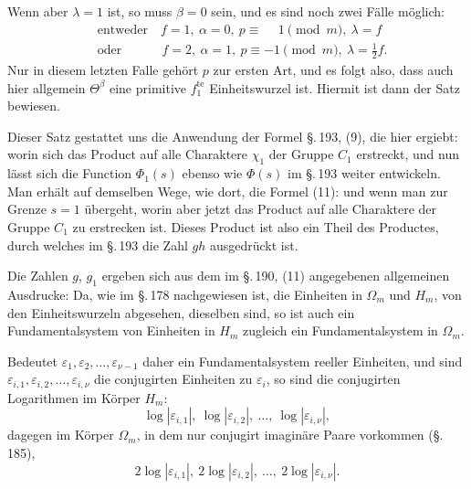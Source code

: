 Wenn aber $\lambda=1$ ist, so muss $\beta=0$ sein, und es sind
noch zwei Fälle möglich:
\[
\begin{aligned}
&\text{entweder}\quad f=1,\ \alpha=0,\ p\equiv\phantom{-}1\pmod{m},\ \lambda=f\\
&\text{oder}\qquad\quad\, f=2,\ \alpha=1,\ p\equiv -1\pmod{m},\ \lambda=\tfrac12 f.
\end{aligned}
\]
Nur in diesem letzten Falle gehört $p$ zur ersten Art, und es
folgt also, dass auch hier allgemein $\Theta^{\beta}$ eine
primitive $f_1^{\text{te}}$ Einheitswurzel ist. Hiermit ist dann
der Satz bewiesen.

Dieser Satz gestattet uns die Anwendung der Formel \S.\,193, (9),
die hier ergiebt:
worin sich das Product auf alle Charaktere $\chi_1$ der Gruppe
$C_1$ erstreckt, und nun lässt sich die Function $\Phi_1(s)$
ebenso wie $\Phi(s)$ im \S.\,193 weiter entwickeln. Man erhält auf
demselben Wege, wie dort, die Formel (11):
und wenn man zur Grenze $s=1$ übergeht,
worin aber jetzt das Product auf alle Charaktere der Gruppe $C_1$
 zu erstrecken ist. Dieses Product
ist also ein Theil des Productes, durch welches im \S.\,193 die
Zahl $gh$ ausgedrückt ist.

Die Zahlen $g$, $g_1$ ergeben sich aus dem im \S.\,190, (11)
angegebenen allgemeinen Ausdrucke:
Da, wie im \S.\,178 nachgewiesen ist, die Einheiten in $\Omega_m$
und $H_m$, von den Einheitswurzeln abgesehen, dieselben sind, so
ist auch ein Fundamentalsystem von Einheiten in $H_m$ zugleich ein
Fundamentalsystem in $\Omega_m$.

Bedeutet $\varepsilon_1,\varepsilon_2,\dots,\varepsilon_{\nu-1}$
daher ein Fundamentalsystem reeller Einheiten, und sind
$\varepsilon_{i,1},\varepsilon_{i,2},\dots,\varepsilon_{i,\nu}$ die
conjugirten Einheiten zu $\varepsilon_i$, so sind die conjugirten
Logarithmen im Körper $H_m$:
\[ \log|\varepsilon_{i,1}|,\ \log|\varepsilon_{i,2}|,\ \dots,\ \log|\varepsilon_{i,\nu}|, \]
dagegen im Körper $\Omega_m$, in dem nur conjugirt imaginäre Paare
vorkommen (\S.\,185),
\[ 2\log|\varepsilon_{i,1}|,\ 2\log|\varepsilon_{i,2}|,\ \dots,\ 2\log|\varepsilon_{i,\nu}|. \]
